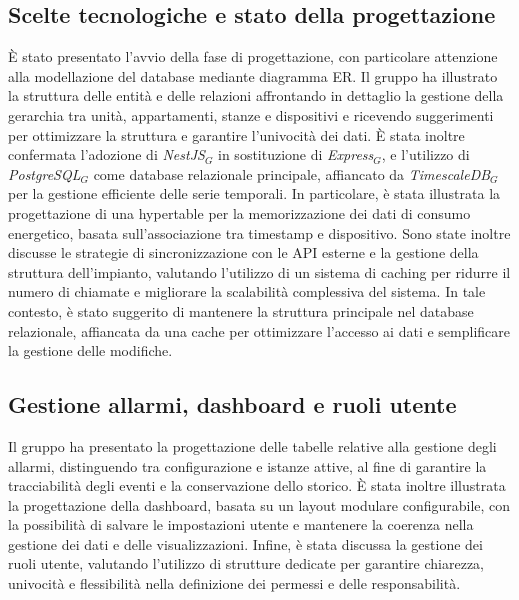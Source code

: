 \documentclass[10pt, letterpaper]{article}
\begin{document}
\subsection{Scelte tecnologiche e stato della progettazione}
È stato presentato l’avvio della fase di progettazione, con particolare attenzione alla modellazione del database mediante diagramma ER. Il gruppo ha illustrato la struttura delle entità e delle relazioni affrontando in dettaglio la gestione della gerarchia tra unità, appartamenti, stanze e dispositivi e ricevendo suggerimenti per ottimizzare la struttura e garantire l’univocità dei dati.
\noindent
È stata inoltre confermata l’adozione di \textit{NestJS$_G$} in sostituzione di \textit{Express$_G$}, e l’utilizzo di \textit{PostgreSQL$_G$} come database relazionale principale, affiancato da \textit{TimescaleDB$_G$} per la gestione efficiente delle serie temporali. In particolare, è stata illustrata la progettazione di una hypertable per la memorizzazione dei dati di consumo energetico, basata sull’associazione tra timestamp e dispositivo.
\noindent
Sono state inoltre discusse le strategie di sincronizzazione con le API esterne e la gestione della struttura dell’impianto, valutando l’utilizzo di un sistema di caching per ridurre il numero di chiamate e migliorare la scalabilità complessiva del sistema. In tale contesto, è stato suggerito di mantenere la struttura principale nel database relazionale, affiancata da una cache per ottimizzare l’accesso ai dati e semplificare la gestione delle modifiche.

\subsection{Gestione allarmi, dashboard e ruoli utente}
Il gruppo ha presentato la progettazione delle tabelle relative alla gestione degli allarmi, distinguendo tra configurazione e istanze attive, al fine di garantire la tracciabilità degli eventi e la conservazione dello storico.
\noindent
È stata inoltre illustrata la progettazione della dashboard, basata su un layout modulare configurabile, con la possibilità di salvare le impostazioni utente e mantenere la coerenza nella gestione dei dati e delle visualizzazioni.
\noindent
Infine, è stata discussa la gestione dei ruoli utente, valutando l’utilizzo di strutture dedicate per garantire chiarezza, univocità e flessibilità nella definizione dei permessi e delle responsabilità.
\end{document}
